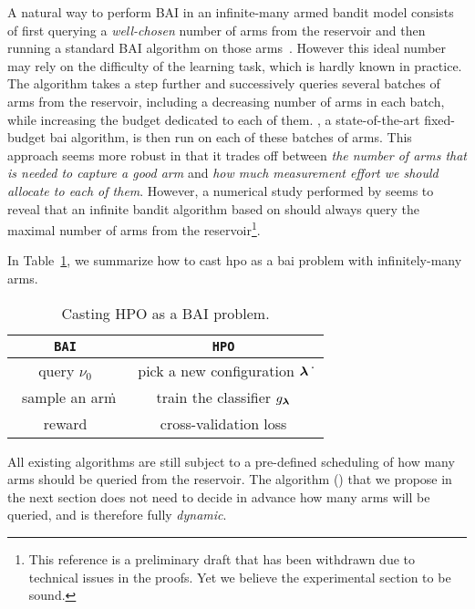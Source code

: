 A natural way to perform BAI in an infinite-many armed bandit model consists of first querying a \emph{well-chosen} number of arms from the reservoir and then running a standard BAI algorithm on those arms~\citep{carpentier2015siri}. However this ideal number may rely on the difficulty of the learning task, which is hardly known in practice. The \Hyperband{} algorithm \citep{li2017hyperband} takes a step further and successively queries several batches of arms from the reservoir, including a decreasing number of arms in each batch, while increasing the budget dedicated to each of them. \SHA \citep{karnin2013sha}, a state-of-the-art fixed-budget \gls{bai} algorithm, is then run on each of these batches of arms. This approach seems more robust in that it trades off between \emph{the number of arms that is needed to capture a good arm} and \emph{how much measurement effort we should allocate to each of them}. However, a numerical study performed by \cite{aziz2018infinite} seems to reveal that an infinite bandit algorithm based on \SHA should always query the maximal number of arms from the reservoir\footnote{This reference is a preliminary draft that has been withdrawn due to technical issues in the proofs. Yet we believe the experimental section to be sound.}. 

In Table~\ref{table:hpo}, we summarize how to cast \gls{hpo} as a \gls{bai} problem with infinitely-many arms.

\begin{table}[ht]
\centering
\def\arraystretch{1.5}
\begin{tabular}[r]{|c|c|} \hline
\textbf{\texttt{BAI}} & \textbf{\texttt{HPO}}\\
\hline
query $\nu_0$ & \ pick a new configuration ${\boldsymbol \lambda}$\.\ \\
\hline
\ sample an arm\. & train the classifier $g_{{\boldsymbol \lambda}}$ \\
\hline
reward & cross-validation loss \\
\hline
\end{tabular}
\caption{Casting HPO as a BAI problem.}
\label{table:hpo}
\end{table}


All existing algorithms are still subject to a pre-defined scheduling of how many arms should be queried from the reservoir. The algorithm (\DTTTS) that we propose in the next section does not need to decide in advance how many arms will be queried, and is therefore fully \emph{dynamic}. %

